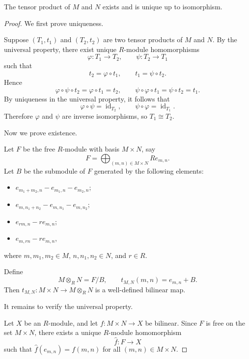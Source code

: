 \begin{theorem}
    The tensor product of $M$ and $N$ exists and is unique up to isomorphism.
\end{theorem}

\begin{proof}
    We first prove uniqueness.

    Suppose $(T_1,t_1)$ and $(T_2,t_2)$ are two tensor products of $M$ and $N$. By the universal property, there exist unique $R$-module homomorphisms
    \[
        \varphi\colon T_1 \to T_2,
        \qquad
        \psi\colon T_2 \to T_1
    \]
    such that
    \[
        t_2 = \varphi \circ t_1,
        \qquad
        t_1 = \psi \circ t_2.
    \]
    Hence
    \[
        \varphi \circ \psi \circ t_2 = \varphi \circ t_1 = t_2,
        \qquad
        \psi \circ \varphi \circ t_1 = \psi \circ t_2 = t_1.
    \]
    By uniqueness in the universal property, it follows that
    \[
        \varphi \circ \psi = \operatorname{id}_{T_2},
        \qquad
        \psi \circ \varphi = \operatorname{id}_{T_1}.
    \]
    Therefore $\varphi$ and $\psi$ are inverse isomorphisms, so $T_1 \cong T_2$.

    Now we prove existence.

    Let $F$ be the free $R$-module with basis $M \times N$, say
    \[
        F = \bigoplus_{(m,n)\in M\times N} R e_{m,n}.
    \]
    Let $B$ be the submodule of $F$ generated by the following elements:
    \begin{itemize}
        \item $e_{m_1+m_2,n}-e_{m_1,n}-e_{m_2,n}$;
        \item $e_{m,n_1+n_2}-e_{m,n_1}-e_{m,n_2}$;
        \item $e_{rm,n}-r e_{m,n}$;
        \item $e_{m,rn}-r e_{m,n}$,
    \end{itemize}
    where $m,m_1,m_2\in M$, $n,n_1,n_2\in N$, and $r\in R$.

    Define
    \[
        M\otimes_R N = F/B,
        \qquad
        t_{M,N}(m,n)=e_{m,n}+B.
    \]
    Then $t_{M,N}\colon M\times N \to M\otimes_R N$ is a well-defined bilinear map.

    It remains to verify the universal property.

    Let $X$ be an $R$-module, and let $f\colon M\times N \to X$ be bilinear. Since $F$ is free on the set $M\times N$, there exists a unique $R$-module homomorphism
    \[
        \hat{f}\colon F \to X
    \]
    such that $\hat{f}(e_{m,n}) = f(m,n)$ for all $(m,n)\in M\times N$.


\end{proof}

